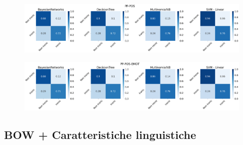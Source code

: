 \documentclass[oneside]{book}
\begin{document}
\begin{figure}[H]
	\centering
	\includegraphics[width=13cm]{assets/reports/conf-matrix/nobow/pp-pos.png}
\end{figure}
\vspace*{-0.8cm}

\begin{figure}[H]
	\centering
	\includegraphics[width=13cm]{assets/reports/conf-matrix/nobow/pp-pos-emot.png}
\end{figure}
\vspace*{-0.8cm}
\restoregeometry
\newpage


\subsection{BOW + Caratteristiche linguistiche}
\end{document}
